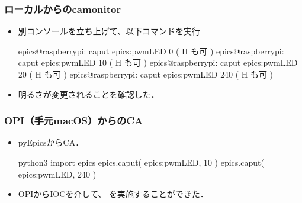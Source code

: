 \documentclass[letterpaper,10pt,dvipdfmx]{sphinxmanual}
\begin{document}
\subsubsection{ローカルからのcamonitor}
\label{\detokenize{epics/rst/example4__arduino_LEDcontrol02:camonitor}}\begin{itemize}
\item {} 
別コンソールを立ち上げて、以下コマンドを実行

\begin{sphinxVerbatim}[commandchars=\\\{\}]
epics@raspberrypi: \PYGZti{} \PYGZdl{} caput epics:pwmLED 0   ( H も可 )
epics@raspberrypi: \PYGZti{} \PYGZdl{} caput epics:pwmLED 10  ( H も可 )
epics@raspberrypi: \PYGZti{} \PYGZdl{} caput epics:pwmLED 20  ( H も可 )
epics@raspberrypi: \PYGZti{} \PYGZdl{} caput epics:pwmLED 240 ( H も可 )
\end{sphinxVerbatim}

\item {} 
明るさが変更されることを確認した．

\end{itemize}


\subsubsection{OPI（手元macOS）からのCA}
\label{\detokenize{epics/rst/example4__arduino_LEDcontrol02:opi-macos-ca}}\begin{itemize}
\item {} 
pyEpicsからCA．

\begin{sphinxVerbatim}[commandchars=\\\{\}]
\PYGZdl{} python3
\PYGZgt{}\PYGZgt{}\PYGZgt{} import epics
\PYGZgt{}\PYGZgt{}\PYGZgt{} epics.caput( \PYGZdq{}epics:pwmLED\PYGZdq{},  10 )
\PYGZgt{}\PYGZgt{}\PYGZgt{} epics.caput( \PYGZdq{}epics:pwmLED\PYGZdq{}, 240 )
\end{sphinxVerbatim}

\item {} 
OPIからIOCを介して、  を実施することができた．

\end{itemize}
\end{document}
